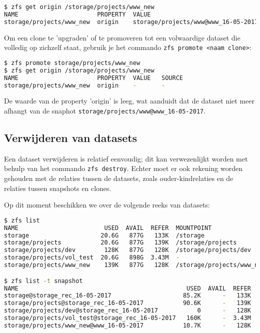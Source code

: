 \begin{lstlisting}[language=bash,style=command_style] 
$ zfs get origin /storage/projects/www_new
NAME                      PROPERTY  VALUE                                SOURCE
storage/projects/www_new  origin    storage/projects/www@www_16-05-2017  -
\end{lstlisting}

Om een clone te 'upgraden' of te promoveren tot een volwaardige dataset die volledig op zichzelf staat, gebruik je het commando \texttt{zfs promote <naam clone>}:

\begin{lstlisting}[language=bash,style=command_style] 
$ zfs promote storage/projects/www_new
$ zfs get origin /storage/projects/www_new
NAME                      PROPERTY  VALUE   SOURCE
storage/projects/www_new  origin    -       -
\end{lstlisting}

De waarde van de property 'origin' is leeg, wat aanduidt dat de dataset niet meer afhangt van de snaphot \texttt{storage/projects/www@www\_16-05-2017}. 

\clearpage

\subsection{Verwijderen van datasets}

Een dataset verwijderen is relatief eenvoudig; dit kan verwezenlijkt worden met behulp van het commando \texttt{zfs destroy}. Echter moet er ook rekening worden gehouden met de relaties tussen de datasets, zoals ouder-kindrelaties en de relaties tussen snapshots en clones.

Op dit moment beschikken we over de volgende reeks van datasets:

\begin{lstlisting}[language=bash,style=command_style] 
$ zfs list
NAME                        USED  AVAIL  REFER  MOUNTPOINT
storage                    20.6G   877G   133K  /storage
storage/projects           20.6G   877G   139K  /storage/projects
storage/projects/dev        128K   877G   128K  /storage/projects/dev
storage/projects/vol_test  20.6G   898G  3.43M  -
storage/projects/www_new    139K   877G   128K  /storage/projects/www_new

$ zfs list -t snapshot
NAME                                               USED  AVAIL  REFER  MOUNTPOINT
storage@storage_rec_16-05-2017                    85.2K      -   133K  -
storage/projects@storage_rec_16-05-2017           90.6K      -   139K  -
storage/projects/dev@storage_rec_16-05-2017           0      -   128K  -
storage/projects/vol_test@storage_rec_16-05-2017   160K      -  3.43M  -
storage/projects/www_new@www_16-05-2017           10.7K      -   128K  -
\end{lstlisting}


